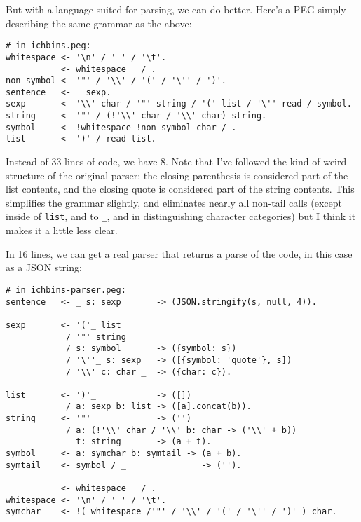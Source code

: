 \documentclass[
]{article}
\begin{document}
But with a language suited for parsing, we can do better. Here's a PEG
simply describing the same grammar as the above:

\begin{verbatim}
# in ichbins.peg:
whitespace <- '\n' / ' ' / '\t'.
_          <- whitespace _ / .
non-symbol <- '"' / '\\' / '(' / '\'' / ')'.
sentence   <- _ sexp.
sexp       <- '\\' char / '"' string / '(' list / '\'' read / symbol.
string     <- '"' / (!'\\' char / '\\' char) string.
symbol     <- !whitespace !non-symbol char / .
list       <- ')' / read list.
\end{verbatim}

Instead of 33 lines of code, we have 8. Note that I've followed the kind
of weird structure of the original parser: the closing parenthesis is
considered part of the list contents, and the closing quote is
considered part of the string contents. This simplifies the grammar
slightly, and eliminates nearly all non-tail calls (except inside of
\texttt{list}, and to \texttt{\_}, and in distinguishing character
categories) but I think it makes it a little less clear.

In 16 lines, we can get a real parser that returns a parse of the code,
in this case as a JSON string:

\begin{verbatim}
# in ichbins-parser.peg:
sentence   <- _ s: sexp       -> (JSON.stringify(s, null, 4)).

sexp       <- '('_ list 
            / '"' string 
            / s: symbol       -> ({symbol: s})
            / '\''_ s: sexp   -> ([{symbol: 'quote'}, s])
            / '\\' c: char _  -> ({char: c}).

list       <- ')'_            -> ([])
            / a: sexp b: list -> ([a].concat(b)).
string     <- '"'_            -> ('') 
            / a: (!'\\' char / '\\' b: char -> ('\\' + b)) 
              t: string       -> (a + t).
symbol     <- a: symchar b: symtail -> (a + b).
symtail    <- symbol / _               -> ('').

_          <- whitespace _ / .
whitespace <- '\n' / ' ' / '\t'.
symchar    <- !( whitespace /'"' / '\\' / '(' / '\'' / ')' ) char.
\end{verbatim}
\end{document}
